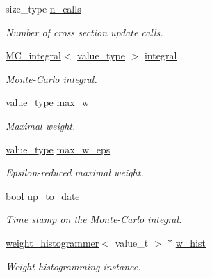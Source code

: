 \begin{DoxyCompactItemize}
\item 
\hypertarget{a00362_a2e1e45d54fd887ddec9f87608020eb9b}{size\-\_\-type \hyperlink{a00362_a2e1e45d54fd887ddec9f87608020eb9b}{n\-\_\-calls}}\label{a00362_a2e1e45d54fd887ddec9f87608020eb9b}

\begin{DoxyCompactList}\small\item\em Number of cross section update calls. \end{DoxyCompactList}\item 
\hypertarget{a00362_a296c31e9f2e4fa4e354a4de17bc75ba2}{\hyperlink{a00363}{M\-C\-\_\-integral}$<$ \hyperlink{a00362_a3353150105036deac9bde097cbf1d8af}{value\-\_\-type} $>$ \hyperlink{a00362_a296c31e9f2e4fa4e354a4de17bc75ba2}{integral}}\label{a00362_a296c31e9f2e4fa4e354a4de17bc75ba2}

\begin{DoxyCompactList}\small\item\em Monte-\/\-Carlo integral. \end{DoxyCompactList}\item 
\hypertarget{a00362_a4681eb8a51df4c2fc0141cfb81fe2a2a}{\hyperlink{a00362_a3353150105036deac9bde097cbf1d8af}{value\-\_\-type} \hyperlink{a00362_a4681eb8a51df4c2fc0141cfb81fe2a2a}{max\-\_\-w}}\label{a00362_a4681eb8a51df4c2fc0141cfb81fe2a2a}

\begin{DoxyCompactList}\small\item\em Maximal weight. \end{DoxyCompactList}\item 
\hypertarget{a00362_a544b23aff9fbc6ccbca3530139924eb5}{\hyperlink{a00362_a3353150105036deac9bde097cbf1d8af}{value\-\_\-type} \hyperlink{a00362_a544b23aff9fbc6ccbca3530139924eb5}{max\-\_\-w\-\_\-eps}}\label{a00362_a544b23aff9fbc6ccbca3530139924eb5}

\begin{DoxyCompactList}\small\item\em Epsilon-\/reduced maximal weight. \end{DoxyCompactList}\item 
\hypertarget{a00362_a661ca4eb73d256ce08767a72faf5e106}{bool \hyperlink{a00362_a661ca4eb73d256ce08767a72faf5e106}{up\-\_\-to\-\_\-date}}\label{a00362_a661ca4eb73d256ce08767a72faf5e106}

\begin{DoxyCompactList}\small\item\em Time stamp on the Monte-\/\-Carlo integral. \end{DoxyCompactList}\item 
\hypertarget{a00362_ac09c414988a3b0904112f86a5cc23148}{\hyperlink{a00576}{weight\-\_\-histogrammer}$<$ value\-\_\-t $>$ $\ast$ \hyperlink{a00362_ac09c414988a3b0904112f86a5cc23148}{w\-\_\-hist}}\label{a00362_ac09c414988a3b0904112f86a5cc23148}

\begin{DoxyCompactList}\small\item\em Weight histogramming instance. \end{DoxyCompactList}\end{DoxyCompactItemize}


